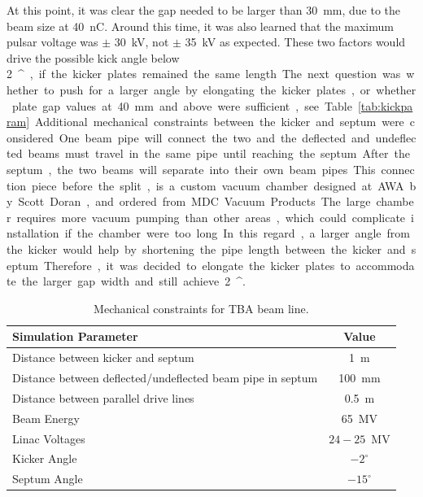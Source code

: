 \documentclass[aps,prab,preprint,groupedaddress,linenumbers]{revtex4-2}
\begin{document}
At this point, it was clear the gap needed to be larger than \SI{30}{mm}, 
due to the beam size at \SI{40}{nC}. Around this time, 
it was also learned that the maximum pulsar voltage was $\pm$ \SI{30}{kV},
not $\pm$ \SI{35}{kV} as expected. 
These two factors would drive the possible kick angle below \SI{2}{^\circ}, 
if the kicker plates remained the same length.
The next question was whether to push for a larger angle by elongating the kicker plates, 
or whether plate gap values at \SI{40}{mm} and above were sufficient, see Table~\ref{tab:kickparam}.
Additional mechanical constraints between the kicker and septum were considered. 
One beam pipe will connect the two and the deflected and undeflected 
beams must travel in the same pipe until reaching the septum.
After the septum, the two beams will separate into their own beam pipes.
This connection piece before the split, is a custom vacuum chamber designed at 
AWA by Scott Doran, and ordered from MDC Vacuum Products. 
The large chamber requires more vacuum pumping than other areas, 
which could complicate installation if the chamber were too long. 
In this regard, a larger angle from the kicker would help by shortening the pipe length between the kicker and septum.
Therefore, it was decided to elongate the kicker plates to accommodate the larger gap width and still achieve \SI{2}{^\circ}.
\begin{table}%
	\begin{center}
		\caption{Mechanical constraints for TBA beam line.}
		\label{tab:mechanical}
		\begin{tabular}{lc}
			\toprule
			\toprule
			\textbf{Simulation Parameter} 	&  \textbf{Value} \\ 
			\midrule
			Distance between kicker and septum	&  \SI{1}{m} \\
			Distance between deflected/undeflected beam pipe in septum	& \SI{100}{mm} \\
			Distance between parallel drive lines	& \SI{0.5}{m} \\
			Beam Energy 				& \SI{65}{MV}\\ 
			Linac Voltages 				& $24-25$\SI{}{MV} \\
			Kicker Angle				& $-2^\circ$ \\
			Septum Angle				& $-15^\circ$\\ 
			\bottomrule
		\end{tabular}
	\end{center}
\end{table}
\end{document}
